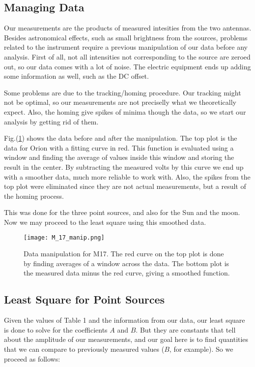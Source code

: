 \documentclass{article}
\begin{document}
\subsection{Managing Data}

Our measurements are the products of measured intesities from the two
antennas. Besides astronomical effects, such as small brightness from
the sources, problems related to the instrument require a previous
manipulation of our data before any analysis. First of all, not all
intensities not corresponding to the source are zeroed out, so our data
comes with a lot of noise. The electric equipment ends up adding some
information as well, such as the DC offset. 

Some problems are due to the tracking/homing procedure. Our
tracking might not be optimal, so our measurements are not preciselly
what we theoretically expect. Also, the homing give spikes of minima
though the data, so we start our analysis by getting rid of them.

Fig.(\ref{m17}) shows the data before and after the manipulation. The top plot
is the data for Orion with a fitting curve in red. This function is
evaluated using a window and finding the average of values inside this
window and storing the result in the center. By subtracting the measured
volts by this curve we end up with a smoother data, much more reliable
to work with. Also, the spikes from the top plot were eliminated since
they are not actual measurements, but a result of the homing process.
 
This was done for the three point sources, and also for the Sun and the
moon. Now we may proceed to the least square using this smoothed data. 

\begin{figure}[H]
\center
\texttt{[image: M\_17\_manip.png]}
\caption {Data manipulation for M17. The red curve on the top plot is
  done by finding averages of a window across the data. The bottom plot
  is the measured data minus the red curve, giving a smoothed function.} 
\label{m17}
\end{figure}

\subsection{Least Square for Point Sources}

Given the values of Table 1 and the information from our data, our least
square is done to solve for the
coefficients $A$ and $B$. But they are constants that tell about the
amplitude of our measurements, and our goal here is to find quantities
that we can compare to previously measured values ($B$, for example). So
we proceed as follows:
\end{document}
